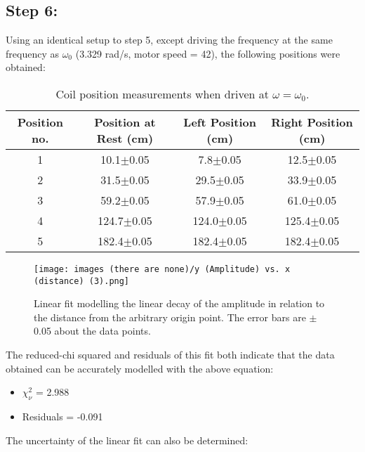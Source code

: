 \documentclass[12pt, letterpaper, twoside]{article}
\begin{document}
\subsection{Step 6:}

Using an identical setup to step 5, except driving the frequency at the same frequency as $\omega_0$ (3.329 rad/s, motor speed = 42), the following positions were obtained:

\begin{table}[!ht]
    \centering
        \begin{tabular}{|c|c|c|c|}
            \hline
            Position no. & Position at Rest (cm) & Left Position (cm) & Right Position (cm)\\
            \hline
            1 & 10.1$\pm$0.05 & 7.8$\pm$0.05 & 12.5$\pm$0.05 \\
            \hline
            2 & 31.5$\pm$0.05 & 29.5$\pm$0.05 & 33.9$\pm$0.05 \\
            \hline
            3 & 59.2$\pm$0.05 & 57.9$\pm$0.05 & 61.0$\pm$0.05 \\
            \hline
            4 & 124.7$\pm$0.05 & 124.0$\pm$0.05 & 125.4$\pm$0.05 \\
            \hline
            5 & 182.4$\pm$0.05 & 182.4$\pm$0.05 & 182.4$\pm$0.05 \\
            \hline
        \end{tabular}
    \caption{Coil position measurements when driven at $\omega = \omega_0$.}
    \label{tab:my_label}
\end{table}


\begin{figure}[!ht]
    \centering
    \texttt{[image: images (there are none)/y (Amplitude) vs. x (distance) (3).png]}
    \caption{Linear fit modelling the linear decay of the amplitude in relation to the distance from the arbitrary origin point. The error bars are $\pm$0.05 about the data points.}
    \label{fig:my_label}
\end{figure}

The reduced-chi squared and residuals of this fit both indicate that the data obtained can be accurately modelled with the above equation:

\begin{itemize}
    \item $\chi^2_\nu$ = 2.988
    \item Residuals = -0.091
\end{itemize}

The uncertainty of the linear fit can also be determined:
\end{document}
